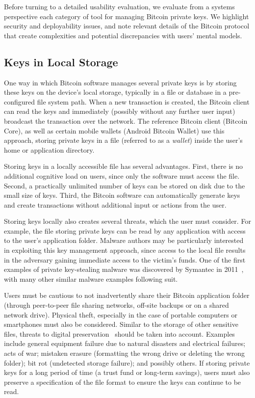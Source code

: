 Before turning to a detailed usability evaluation, we evaluate from a systems perspective each category of tool for managing Bitcoin private keys. We highlight security and deployability issues, and note relevant details of the Bitcoin protocol that create complexities and potential discrepancies with users' mental models.

\subsection{Keys in Local Storage}
\label{sec:localstorage}
One way in which Bitcoin software manages several private keys is by storing these keys on the device's local storage, typically in a file or database in a pre-configured file system path. When a new transaction is created, the Bitcoin client can read the keys and immediately (possibly without any further user input) broadcast the transaction over the network. The reference Bitcoin client (Bitcoin Core), as well as certain mobile wallets (\eg Android Bitcoin Wallet) use this approach, storing private keys in a file (referred to as a \emph{wallet}) inside the user's home or application directory. 

Storing keys in a locally accessible file has several advantages. First, there is no additional cognitive load on users, since only the software must access the file. Second, a practically unlimited number of keys can be stored on disk due to the small size of keys. Third, the Bitcoin software can automatically generate keys and create transactions without additional input or actions from the user. 

Storing keys locally also creates several threats, which the user must consider. For example, the file storing private keys can be read by any application with access to the user's application folder. Malware authors may be particularly interested in exploiting this key management approach, since access to the local file results in the adversary gaining immediate access to the victim's funds. One of the first examples of private key-stealing malware was discovered by Symantec in 2011~\cite{coinbit}, with many other similar malware examples following suit.

Users must be cautious to not inadvertently share their Bitcoin application folder (\eg through peer-to-peer file sharing networks, off-site backups or on a shared network drive). Physical theft, especially in the case of portable computers or smartphones must also be considered. Similar to the storage of other sensitive files, threats to digital preservation~\cite{BKM05} should be taken into account. Examples include general equipment failure due to natural disasters and electrical failures; acts of war; mistaken erasure (\eg formatting the wrong drive or deleting the wrong folder); bit rot (\ie undetected storage failure); and possibly others. If storing private keys for a long period of time (\eg a trust fund or long-term savings), users must also preserve a specification of the file format to ensure the keys can continue to be read.

